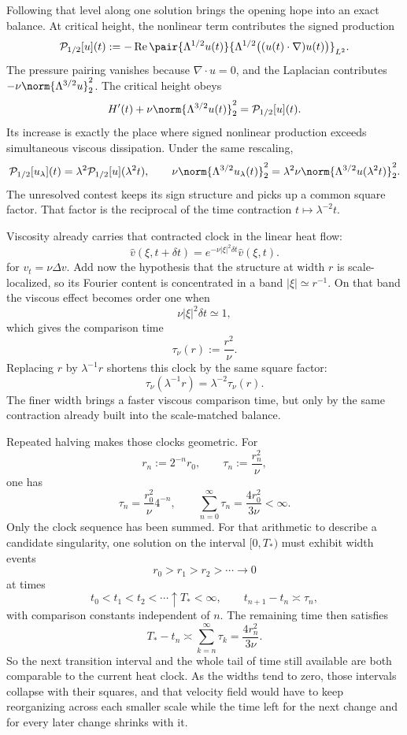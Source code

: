 
Following that level along one solution brings the opening hope into an exact balance. At critical height, the nonlinear term contributes the signed production
\[
  \mathcal P_{1/2}[u](t)
  :=
  -\operatorname{Re}
  \pair
    {\Lambda^{1/2}u(t)}
    {\Lambda^{1/2}\bigl((u(t)\cdot\nabla)u(t)\bigr)}_{L^2}.
\]
The pressure pairing vanishes because \(\nabla\cdot u=0\), and the Laplacian contributes \(-\nu\norm{\Lambda^{3/2}u}_2^2\). The critical height obeys
\[
  H'(t)
  +
  \nu\norm{\Lambda^{3/2}u(t)}_2^2
  =
  \mathcal P_{1/2}[u](t).
\]
Its increase is exactly the place where signed nonlinear production exceeds simultaneous viscous dissipation. Under the same rescaling,
\[
  \mathcal P_{1/2}[u_\lambda](t)
  =
  \lambda^2\mathcal P_{1/2}[u](\lambda^2t),
  \qquad
  \nu\norm{\Lambda^{3/2}u_\lambda(t)}_2^2
  =
  \lambda^2\nu\norm{\Lambda^{3/2}u(\lambda^2t)}_2^2.
\]
The unresolved contest keeps its sign structure and picks up a common square factor. That factor is the reciprocal of the time contraction \(t\mapsto\lambda^{-2}t\).


Viscosity already carries that contracted clock in the linear heat flow:
\[
  \widehat v(\xi,t+\delta t)
  =
  e^{-\nu|\xi|^2\delta t}\widehat v(\xi,t).
\]
for \(v_t=\nu\Delta v\). Add now the hypothesis that the structure at width \(r\) is scale-localized, so its Fourier content is concentrated in a band \(|\xi|\simeq r^{-1}\). On that band the viscous effect becomes order one when
\[
  \nu|\xi|^2\delta t\simeq1,
\]
which gives the comparison time
\[
  \tau_\nu(r)
  :=
  \frac{r^2}{\nu}.
\]
Replacing \(r\) by \(\lambda^{-1}r\) shortens this clock by the same square factor:
\[
  \tau_\nu(\lambda^{-1}r)
  =
  \lambda^{-2}\tau_\nu(r).
\]
The finer width brings a faster viscous comparison time, but only by the same contraction already built into the scale-matched balance.


Repeated halving makes those clocks geometric. For
\[
  r_n:=2^{-n}r_0,
  \qquad
  \tau_n:=\frac{r_n^2}{\nu},
\]
one has
\[
  \tau_n
  =
  \frac{r_0^2}{\nu}4^{-n},
  \qquad
  \sum_{n=0}^{\infty}\tau_n
  =
  \frac{4r_0^2}{3\nu}
  <
  \infty.
\]
Only the clock sequence has been summed. For that arithmetic to describe a candidate singularity, one \NavierStokes{} solution on the interval \([0,T_*)\) must exhibit width events
\[
  r_0>r_1>r_2>\cdots\longrightarrow0
\]
at times
\[
  t_0<t_1<t_2<\cdots\uparrow T_*<\infty,
  \qquad
  t_{n+1}-t_n\asymp\tau_n,
\]
with comparison constants independent of \(n\). The remaining time then satisfies
\[
  T_*-t_n
  \asymp
  \sum_{k=n}^{\infty}\tau_k
  =
  \frac{4r_n^2}{3\nu}.
\]
So the next transition interval and the whole tail of time still available are both comparable to the current heat clock. As the widths tend to zero, those intervals collapse with their squares, and that velocity field would have to keep reorganizing across each smaller scale while the time left for the next change and for every later change shrinks with it.
